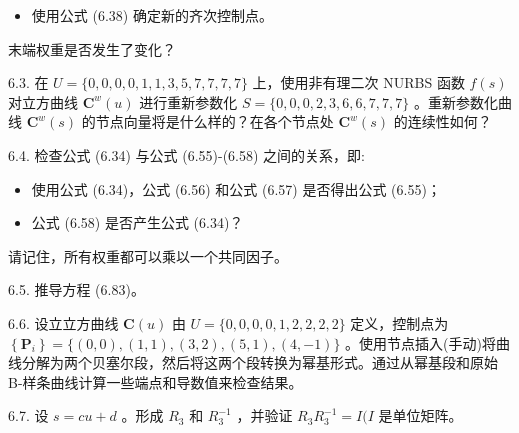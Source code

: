 \documentclass[../main.tex]{subfiles}
\begin{document}
\begin{itemize}
\item 使用公式 (6.38) 确定新的齐次控制点。
\end{itemize}

末端权重是否发生了变化？

6.3. 在 \(U = \{ 0,0,0,0,1,1,3,5,7,7,7,7\}\) 上，使用非有理二次 NURBS 函数 \(f\left( s\right)\) 对立方曲线 \({\mathbf{C}}^{w}\left( u\right)\) 进行重新参数化 \(S = \{ 0,0,0,2,3,6,6,7,7,7\}\) 。重新参数化曲线 \({\mathbf{C}}^{w}\left( s\right)\) 的节点向量将是什么样的？在各个节点处 \({\mathbf{C}}^{w}\left( s\right)\) 的连续性如何？

6.4. 检查公式 (6.34) 与公式 (6.55)-(6.58) 之间的关系，即:

\begin{itemize}
\item 使用公式 (6.34)，公式 (6.56) 和公式 (6.57) 是否得出公式 (6.55)；
\end{itemize}

\begin{itemize}
\item 公式 (6.58) 是否产生公式 (6.34)？
\end{itemize}

请记住，所有权重都可以乘以一个共同因子。

6.5. 推导方程 (6.83)。

6.6. 设立立方曲线 \(\mathbf{C}\left( u\right)\) 由 \(U = \{ 0,0,0,0,1,2,2,2,2\}\) 定义，控制点为 \(\left\{  {\mathbf{P}}_{i}\right\}   = \{ \left( {0,0}\right) ,\left( {1,1}\right) ,\left( {3,2}\right) ,\left( {5,1}\right) ,\left( {4, - 1}\right) \}\) 。使用节点插入(手动)将曲线分解为两个贝塞尔段，然后将这两个段转换为幂基形式。通过从幂基段和原始 B-样条曲线计算一些端点和导数值来检查结果。

6.7. 设 \(s = {cu} + d\) 。形成 \({R}_{3}\) 和 \({R}_{3}^{-1}\) ，并验证 \({R}_{3}{R}_{3}^{-1} = I(I\) 是单位矩阵。



\clearpage
\end{document}
